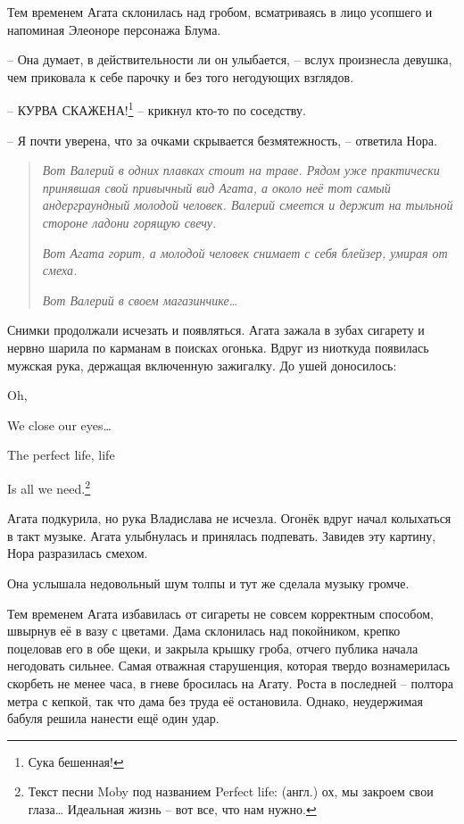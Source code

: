 \documentclass[
  a5paperpaper,
  DIV=11,
  numbers=noendperiod]{scrreprt}
\begin{document}
Тем временем Агата склонилась над гробом, всматриваясь в лицо усопшего и
напоминая Элеоноре персонажа Блума.

-- Она думает, в действительности ли он улыбается, -- вслух произнесла
девушка, чем приковала к себе парочку и без того негодующих взглядов.

-- КУРВА СКАЖЕНА!\footnote{Сука бешенная!} -- крикнул кто-то по
соседству.

-- Я почти уверена, что за очками скрывается безмятежность, -- ответила
Нора.

\begin{quote}
\emph{Вот Валерий в одних плавках стоит на траве. Рядом уже практически
принявшая свой привычный вид Агата, а около неё тот самый андерграундный
молодой человек. Валерий смеется и держит на тыльной стороне ладони
горящую свечу.}

\emph{Вот Агата горит, а молодой человек снимает с себя блейзер, умирая
от смеха.}

\emph{Вот Валерий в своем магазинчике\ldots{}}
\end{quote}

Снимки продолжали исчезать и появляться. Агата зажала в зубах сигарету и
нервно шарила по карманам в поисках огонька. Вдруг из ниоткуда появилась
мужская рука, держащая включенную зажигалку. До ушей доносилось:

Oh,

We close our eyes\ldots{}

The perfect life, life

Is all we need.\footnote{Текст песни Moby под названием Perfect life:
  (англ.) ох, мы закроем свои глаза\ldots{} Идеальная жизнь -- вот все,
  что нам нужно.}

Агата подкурила, но рука Владислава не исчезла. Огонёк вдруг начал
колыхаться в такт музыке. Агата улыбнулась и принялась подпевать.
Завидев эту картину, Нора разразилась смехом.

Она услышала недовольный шум толпы и тут же сделала музыку громче.

Тем временем Агата избавилась от сигареты не совсем корректным способом,
швырнув её в вазу с цветами. Дама склонилась над покойником, крепко
поцеловав его в обе щеки, и закрыла крышку гроба, отчего публика начала
негодовать сильнее. Самая отважная старушенция, которая твердо
вознамерилась скорбеть не менее часа, в гневе бросилась на Агату. Роста
в последней -- полтора метра с кепкой, так что дама без труда её
остановила. Однако, неудержимая бабуля решила нанести ещё один удар.
\end{document}
